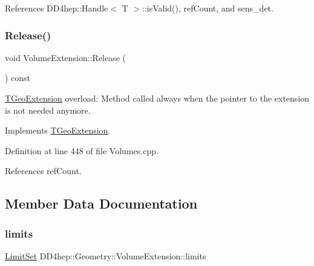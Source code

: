 References D\+D4hep\+::\+Handle$<$ T $>$\+::is\+Valid(), ref\+Count, and sens\+\_\+det.

\hypertarget{class_d_d4hep_1_1_geometry_1_1_volume_extension_a9351245472026a410a0b3d1c95c1302e}{}\label{class_d_d4hep_1_1_geometry_1_1_volume_extension_a9351245472026a410a0b3d1c95c1302e} 
\subsubsection{\texorpdfstring{Release()}{Release()}}
{\footnotesize\ttfamily void Volume\+Extension\+::\+Release (\begin{DoxyParamCaption}{ }\end{DoxyParamCaption}) const\hspace{0.3cm}{\ttfamily [virtual]}}



\hyperlink{class_t_geo_extension}{T\+Geo\+Extension} overload\+: Method called always when the pointer to the extension is not needed anymore. 



Implements \hyperlink{class_t_geo_extension_af3013d9059744f1d7f9f9037a57bf3da}{T\+Geo\+Extension}.



Definition at line 448 of file Volumes.\+cpp.



References ref\+Count.



\subsection{Member Data Documentation}
\hypertarget{class_d_d4hep_1_1_geometry_1_1_volume_extension_a2197ef0277ad4fdebc1a285ec311d019}{}\label{class_d_d4hep_1_1_geometry_1_1_volume_extension_a2197ef0277ad4fdebc1a285ec311d019} 
\subsubsection{\texorpdfstring{limits}{limits}}
{\footnotesize\ttfamily \hyperlink{class_d_d4hep_1_1_geometry_1_1_limit_set}{Limit\+Set} D\+D4hep\+::\+Geometry\+::\+Volume\+Extension\+::limits}



